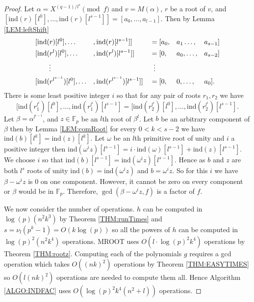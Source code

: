 \documentclass{article}
\theoremstyle{plain}
\theoremstyle{definition}
\def\Fp {{ \mathbb{F} _ {p} }}
\def\ind {{ \mathrm{ind} }}
\begin{document}
		\begin{proof}
		    Let $\alpha=X^{(q-1)/{l^s}} \pmod f$ and $v=M(\alpha)$, $r$ be a root of $v$, and $[\ind(r)[l^0],\ldots,\ind(r)[l^{s-1}] ]=[a_0,\ldots,a_{l-1}]$. Then by Lemma \ref{LEM:leftShift}
				\begin{alignat*}{5}
				    &[\ind(r)[l^0],     \ldots&&,     \ind(r)[l^{s-1}] ]           &&= [a_0,&&a_1\ldots ,&&a_{s-1}]   \\
						&[\ind(r^l)[l^0],   \ldots&&,     \ind(r^l)[l^{s-1}] ]         &&= [0,  &&a_0,\ldots,&&a_{s-2}]   \\
						&     \vdotswithin{\ind(r^l)[l^0]}&&                           &&\vdotswithin{=}    &&&&              \\
						&[\ind(r^{l^{s-1}})[l^0],\ldots&&,\ind(r^{l^{s-1}})[l^{s-1}] ] &&= [0,  &&0,\ldots  ,&&a_0 ]. 
				\end{alignat*}
				There is some least positive integer $i$ so that for any pair of roots $r_1,r_2$ we have 
				    \[ [\ind(r_1^{l^{i}})[l^0],\ldots,\ind(r_1^{l^{i}})[l^{s-1}]=[\ind(r_2^{l^{i}})[l^0],\ldots,\ind(r_2^{l^{i}})[l^{s-1}]. \]
				Let $\beta=\alpha^{l^{i-1}}$, and $z \in \Fp$ be an $l$th root of $\beta^l$. Let $b$ be an arbitrary component of $\beta$ then by Lemma \ref{LEM:comRoot} for every $0<k<s-2$ we have $\ind(b)[l^k]=\ind(z)[l^k]$. Let $\omega$ be an $l$th primitive root of unity and $i$ a positive integer then $\ind(\omega^i z)[l^{s-1}]=i \cdot \ind(\omega)[l^{s-1}]+\ind(z)[l^{s-1}]$. We choose $i$ so that $\ind(b)[l^{s-1}]=\ind(\omega^iz)[l^{s-1}]$. Hence as $b$ and $z$ are both $l^s$ roots of unity $\ind(b)=\ind(\omega^iz)$ and $b={\omega^i}z$. So for this $i$ we have $\beta-{\omega^i}z$ is 0 on one component. However, it cannot be zero on every component or $\beta$ would be in $\Fp$. Therefore, $\gcd(\beta-\omega^{i}z,f)$ is a factor of $f$. 
				
				We now consider the number of operations. $h$ can be computed in $\log(p)(n^2k^3)$ by Theorem \ref{THM:runTimes} and $s=\nu_{l}(p^k-1)=O(k\log(p))$ so all the powers of $h$ can be computed in $\log(p)^2(n^2k^4)$ operations. MROOT uses $O(l \cdot \log(p)^2 k^4)$ operations by Theorem \ref{THM:rootz}. Computing each of the polynomials $g$ requires a gcd operation which takes $O((nk)^2)$ operations by Theorem \ref{THM:EASYTIMES} so $O(l(nk)^2)$ operations are needed to compute them all. Hence Algorithm \ref{ALGO:INDFAC} uses $O(\log(p)^2 k^4(n^2+l))$ operations.
		\end{proof}
		
		
\end{document}

